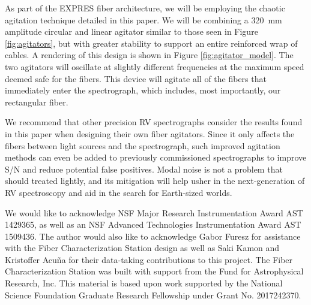 \documentclass[twocolumn]{emulateapj}
\begin{document}
As part of the EXPRES fiber architecture, we will be employing the chaotic agitation technique detailed in this paper. We will be combining a \SI{320}{\milli\meter} amplitude circular and linear agitator similar to those seen in Figure \ref{fig:agitators}, but with greater stability to support an entire reinforced wrap of cables. A rendering of this design is shown in Figure \ref{fig:agitator_model}. The two agitators will oscillate at slightly different frequencies at the maximum speed deemed safe for the fibers. This device will agitate all of the fibers that immediately enter the spectrograph, which includes, most importantly, our rectangular fiber.

We recommend that other precision RV spectrographs consider the results found in this paper when designing their own fiber agitators. Since it only affects the fibers between light sources and the spectrograph, such improved agitation methods can even be added to previously commissioned spectrographs to improve S/N and reduce potential false positives. Modal noise is not a problem that should treated lightly, and its mitigation will help usher in the next-generation of RV spectroscopy and aid in the search for Earth-sized worlds.

\acknowledgments

We would like to acknowledge NSF Major Research Instrumentation Award AST 1429365, as well as an NSF Advanced Technologies Instrumentation Award AST 1509436. The author would also like to acknowledge Gabor Furesz for assistance with the Fiber Characterization Station design as well as Saki Kamon and Kristoffer Acu\~na for their data-taking contributions to this project. The Fiber Characterization Station was built with support from the Fund for Astrophysical Research, Inc. This material is based upon work supported by the National Science Foundation Graduate Research Fellowship under Grant No. 2017242370.

\end{document}

